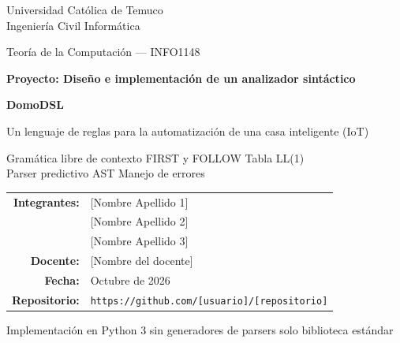 \documentclass[11pt,a4paper]{article}
\begin{document}
\begin{titlepage}
\centering
{\large Universidad Católica de Temuco\\ Ingeniería Civil Informática\par}
\vspace{0.6cm}
{\large Teoría de la Computación --- INFO1148\par}
\vspace{2.2cm}
{\Large\bfseries\color{azul} Proyecto: Diseño e implementación de un analizador sintáctico\par}
\vspace{0.6cm}
{\Huge\bfseries\color{azul} DomoDSL\par}
\vspace{0.3cm}
{\large Un lenguaje de reglas para la automatización de una casa inteligente (IoT)\par}
\vspace{1.4cm}
{\large Gramática libre de contexto \textperiodcentered{} FIRST y FOLLOW \textperiodcentered{} Tabla LL(1)\\
Parser predictivo \textperiodcentered{} AST \textperiodcentered{} Manejo de errores\par}
\vspace{2.6cm}
\begin{tabular}{rl}
\textbf{Integrantes:} & [Nombre Apellido 1] \\
 & [Nombre Apellido 2] \\
 & [Nombre Apellido 3] \\[6pt]
\textbf{Docente:} & [Nombre del docente] \\[6pt]
\textbf{Fecha:} & Octubre de 2026 \\[6pt]
\textbf{Repositorio:} & \texttt{https://github.com/[usuario]/[repositorio]}
\end{tabular}
\vfill
{\small Implementación en Python 3 \textperiodcentered{} sin generadores de parsers \textperiodcentered{} solo biblioteca estándar\par}
\end{titlepage}
\tableofcontents
\clearpage
\newcommand{\parte}{1}



\renewcommand{\parte}{2}
\end{document}
